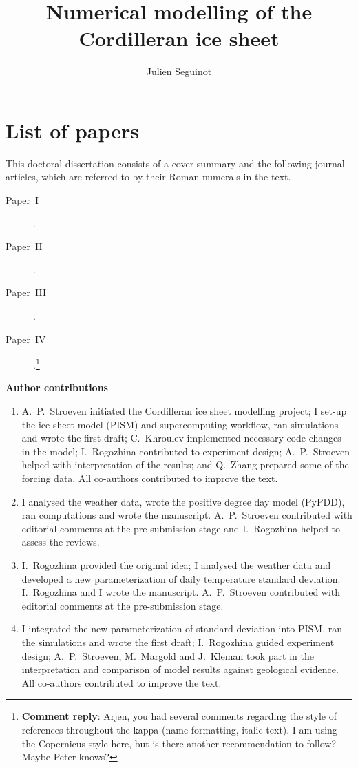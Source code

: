 \documentclass{article}
\title{Numerical modelling of the Cordilleran ice sheet}
\author{Julien Seguinot}
\newcommand{\renote}[1]{\footnote{\textbf{Comment reply}: #1}}
\newcommand{\CCLI}[0]{Paper~I}      %
\newcommand{\PSDV}[0]{Paper~II}     %
\newcommand{\PSDP}[0]{Paper~III}    %
\newcommand{\CCYC}[0]{Paper~IV}     %
\begin{document}

\section*{List of papers}

This doctoral dissertation consists of a cover summary and the following
journal articles, which are referred to by their Roman numerals in the text.

\begin{description}
  \item[\CCLI] .
  \item[\PSDV] .
  \item[\PSDP] .
  \item[\CCYC] .\renote{
    Arjen, you had several comments regarding the style of references
    throughout the kappa (name formatting, italic text). I am using the
    Copernicus style here, but is there another recommendation to follow?
    Maybe Peter knows?}
\end{description}

\vfill
\noindent\textbf{Author contributions}

\footnotesize{\begin{enumerate}
  \item[I] A.~P.~Stroeven initiated the Cordilleran ice sheet modelling
project; I set-up the ice sheet model (PISM) and supercomputing workflow, ran
simulations and wrote the first draft; C.~Khroulev implemented necessary code
changes in the model; I.~Rogozhina contributed to experiment design; A.~P.~Stroeven
helped with interpretation of the results; and Q.~Zhang prepared some of the
forcing data. All co-authors contributed to improve the text.
  \item[II] I analysed the weather data, wrote the positive degree day model
(PyPDD), ran computations and wrote the manuscript. A.~P.~Stroeven contributed
with editorial comments at the pre-submission stage and I.~Rogozhina helped to
assess the reviews.
  \item[III] I.~Rogozhina provided the original idea; I analysed the weather
data and developed a new parameterization of daily temperature standard
deviation. I.~Rogozhina and I wrote the manuscript. A.~P.~Stroeven contributed
with editorial comments at the pre-submission stage.
  \item[IV] I integrated the new parameterization of standard deviation into
PISM, ran the simulations and wrote the first draft; I.~Rogozhina guided
experiment design; A.~P.~Stroeven, M.~Margold and J.~Kleman took part in the
interpretation and comparison of model results against geological evidence. All
co-authors contributed to improve the text.
\end{enumerate}}
\end{document}
